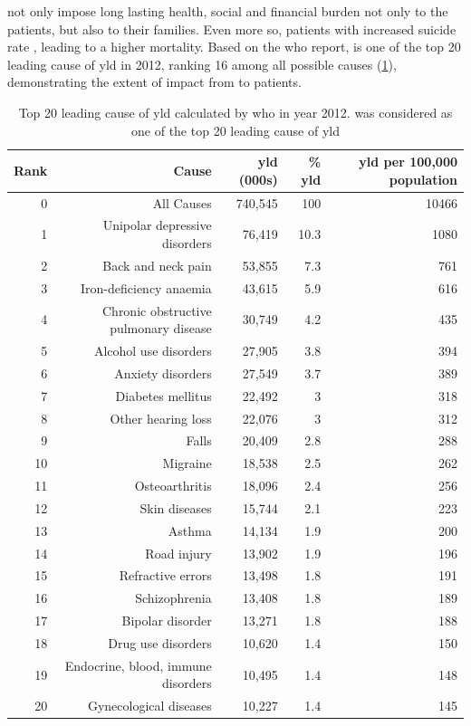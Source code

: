 \documentclass{book}
\newcommand*{\glng}{\glsentrylong}
\newcommand*{\Glng}{\Glsentrylong}
\begin{document}
	\Glng{scz} not only impose long lasting health, social and financial burden not only to the patients, but also to their families\citep{Knapp2004}. 
	Even more so, patients with \glng{scz} increased suicide rate \citep{Saha2007}, leading to a higher mortality.
	Based on the \gls{who} report, \glng{scz} is one of the top 20 leading cause of \gls{yld} in 2012, ranking 16 among all possible causes (\cref{tab:whoYLD}), demonstrating the extent of impact from \glng{scz} to patients.
	\begin{table}
		\centering
		\caption[Top 20 leading cause of \glng{yld} calculated by  in year 2012]{Top 20 leading cause of \gls{yld} calculated by \gls{who} in year 2012.
			\Glng{scz} was considered as one of the top 20 leading cause of \gls{yld}\citep{Geneva2013}}
		\begin{tabular}{rrrrr}
			\toprule
			Rank  & Cause & \gls{yld} (000s) & \% \gls{yld} & \gls{yld} per 100,000 population \\
			\midrule
			0     & All Causes & 740,545 & 100   & 10466 \\
			1     & Unipolar depressive disorders & 76,419 & 10.3  & 1080 \\
			2     & Back and neck pain & 53,855 & 7.3   & 761 \\
			3     & Iron-deficiency anaemia & 43,615 & 5.9   & 616 \\
			4     & Chronic obstructive pulmonary disease & 30,749 & 4.2   & 435 \\
			5     & Alcohol use disorders & 27,905 & 3.8   & 394 \\
			6     & Anxiety disorders & 27,549 & 3.7   & 389 \\
			7     & Diabetes mellitus & 22,492 & 3     & 318 \\
			8     & Other hearing loss & 22,076 & 3     & 312 \\
			9     & Falls & 20,409 & 2.8   & 288 \\
			10    & Migraine & 18,538 & 2.5   & 262 \\
			11    & Osteoarthritis & 18,096 & 2.4   & 256 \\
			12    & Skin diseases & 15,744 & 2.1   & 223 \\
			13    & Asthma & 14,134 & 1.9   & 200 \\
			14    & Road injury & 13,902 & 1.9   & 196 \\
			15    & Refractive errors & 13,498 & 1.8   & 191 \\
			16    & Schizophrenia & 13,408 & 1.8   & 189 \\
			17    & Bipolar disorder & 13,271 & 1.8   & 188 \\
			18    & Drug use disorders & 10,620 & 1.4   & 150 \\
			19    & Endocrine, blood, immune disorders & 10,495 & 1.4   & 148 \\
			20    & Gynecological diseases & 10,227 & 1.4   & 145 \\
			\bottomrule
		\end{tabular}%
		\label{tab:whoYLD}%
	\end{table}%
	
\end{document}
